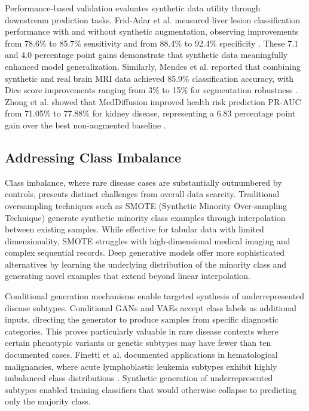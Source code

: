 Performance-based validation evaluates synthetic data utility through downstream prediction tasks. Frid-Adar et al. measured liver lesion classification performance with and without synthetic augmentation, observing improvements from 78.6\% to 85.7\% sensitivity and from 88.4\% to 92.4\% specificity \cite{fridadar2018gan}. These 7.1 and 4.0 percentage point gains demonstrate that synthetic data meaningfully enhanced model generalization. Similarly, Mendes et al. reported that combining synthetic and real brain MRI data achieved 85.9\% classification accuracy, with Dice score improvements ranging from 3\% to 15\% for segmentation robustness \cite{mendes2025synthetic}. Zhong et al. showed that MedDiffusion improved health risk prediction PR-AUC from 71.05\% to 77.88\% for kidney disease, representing a 6.83 percentage point gain over the best non-augmented baseline \cite{zhong2024meddiffusion}.

\subsection{Addressing Class Imbalance}

Class imbalance, where rare disease cases are substantially outnumbered by controls, presents distinct challenges from overall data scarcity. Traditional oversampling techniques such as SMOTE (Synthetic Minority Over-sampling Technique) generate synthetic minority class examples through interpolation between existing samples. While effective for tabular data with limited dimensionality, SMOTE struggles with high-dimensional medical imaging and complex sequential records. Deep generative models offer more sophisticated alternatives by learning the underlying distribution of the minority class and generating novel examples that extend beyond linear interpolation.

Conditional generation mechanisms enable targeted synthesis of underrepresented disease subtypes. Conditional GANs and VAEs accept class labels as additional inputs, directing the generator to produce samples from specific diagnostic categories. This proves particularly valuable in rare disease contexts where certain phenotypic variants or genetic subtypes may have fewer than ten documented cases. Finetti et al. documented applications in hematological malignancies, where acute lymphoblastic leukemia subtypes exhibit highly imbalanced class distributions \cite{finetti2025data}. Synthetic generation of underrepresented subtypes enabled training classifiers that would otherwise collapse to predicting only the majority class.

